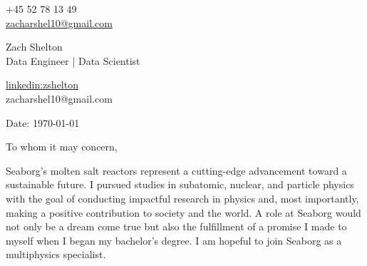 \documentclass[11pt,a4]{article}
\begin{document}
\begin{center}
    \begin{minipage}[b]{0.24\textwidth}
            \large +45 52 78 13 49 \\
            \large \href{mailto:zacharshel10@gmail.com}{zacharshel10@gmail.com} 
    \end{minipage}%
    \begin{minipage}[b]{0.5\textwidth}
            \centering
            {\Huge Zach Shelton} \\ %
            \vspace{0.1cm}
            {\color{UI_blue} \Large{Data Engineer | Data Scientist}} \\
    \end{minipage}%
    \begin{minipage}[b]{0.24\textwidth}
            \flushright \large
            {\href{https://www.linkedin.com/in/zshelton/}{linkedin:zshelton} } \\
            zacharshel10@gmail.com
    \end{minipage}   
    
\vspace{-0.15cm} 
{\color{UI_blue} \hrulefill}
\end{center}

\justify
\setlength{\parindent}{0pt}
\setlength{\parskip}{12pt}
\vspace{0.1cm}


Date: \today \par \vspace{-0.1cm}

To whom it may concern,

Seaborg's molten salt reactors represent a cutting-edge advancement toward a sustainable future. I pursued studies in subatomic, nuclear, and particle physics with the goal of conducting impactful research in physics and, most importantly, making a positive contribution to society and the world. A role at Seaborg would not only be a dream come true but also the fulfillment of a promise I made to myself when I began my bachelor's degree. I am hopeful to join Seaborg as a multiphysics specialist.
\end{document}
